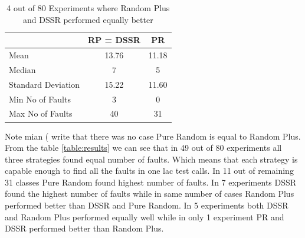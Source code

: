 \documentclass[conference]{IEEEtran}
\begin{document}

\begin{table}[H]
\caption{4 out of 80 Experiments where Random Plus and DSSR performed equally better}
\centering
\begin{tabular}{|l|c|c|}
\hline\hline
 				& RP = DSSR			&  PR \\[1ex]
\hline
Mean  			&    13.76				&  11.18\\
Median 			&    7 				&  5\\
Standard Deviation 	&    15.22				&  11.60\\
Min No of Faults	&    3					&  0\\
Max No of Faults 	&    40				&  31\\
\hline
\end{tabular}
\label{table:result4}
\end{table}





Note mian ( write that there was no case Pure Random is equal to Random Plus.\\


From the table \ref{table:results} we can see that in 49 out of 80 experiments all three strategies found equal number of faults. Which means that each strategy is capable enough to find all the faults in one lac test calls. In 11 out of remaining 31 classes Pure Random found highest number of faults. In 7 experiments DSSR found the highest number of faults while in same number of cases Random Plus performed better than DSSR and Pure Random. In 5 experiments both DSSR and Random Plus performed equally well while in only 1 experiment PR and DSSR performed better than Random Plus. 
\end{document}
